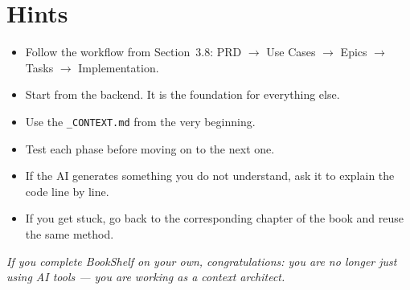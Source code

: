 \section{Hints}

\begin{itemize}
  \item Follow the workflow from Section~3.8: PRD $\rightarrow$ Use Cases $\rightarrow$ Epics $\rightarrow$ Tasks $\rightarrow$ Implementation.
  \item Start from the backend. It is the foundation for everything else.
  \item Use the \texttt{\_CONTEXT.md} from the very beginning.
  \item Test each phase before moving on to the next one.
  \item If the AI generates something you do not understand, ask it to explain the code line by line.
  \item If you get stuck, go back to the corresponding chapter of the book and reuse the same method.
\end{itemize}

\vfill
\begin{center}
\textit{If you complete BookShelf on your own, congratulations: you are no longer just using AI tools --- you are working as a context architect.}
\end{center}
